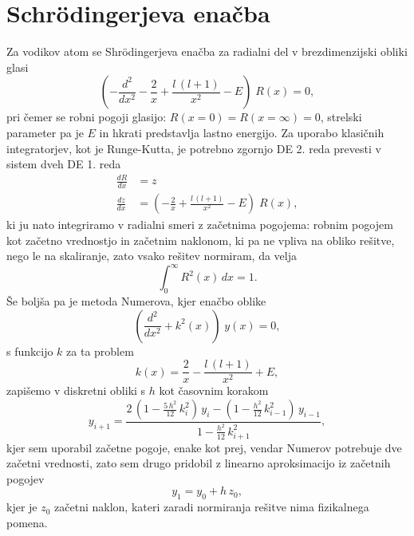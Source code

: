 \graphicspath{{3.nal_slike/}}

\section{Schr{\"o}dingerjeva enačba}

Za vodikov atom se Shr{\"o}dingerjeva enačba za radialni del v brezdimenzijski obliki glasi
\begin{equation}
    \left( -\frac{d^2}{dx^2} - \frac{2}{x} + \frac{l\,(l+1)}{x^2} - E\right)\; R(x) = 0, 
\end{equation}
pri čemer se robni pogoji glasijo: $R(x=0)=R(x=\infty)=0$, strelski parameter pa je $E$ in hkrati predstavlja lastno energijo. Za uporabo klasičnih integratorjev, kot je Runge-Kutta, je potrebno zgornjo DE 2. reda prevesti v sistem dveh DE 1. reda
\begin{align}
    \frac{dR}{dx} &= z\\\nonumber
    \frac{dz}{dx} &= \left(-\frac{2}{x} + \frac{l\,(l+1)}{x^2} - E\right)\; R(x),
\end{align}
ki ju nato integriramo v radialni smeri z začetnima pogojema: robnim pogojem kot začetno vrednostjo in začetnim naklonom, ki pa ne vpliva na obliko rešitve, nego le na skaliranje, zato vsako rešitev normiram, da velja
\begin{equation}
    \int_{0}^{\infty} R^2(x)\,dx = 1.
\end{equation}
Še boljša pa je metoda Numerova, kjer enačbo oblike
\begin{equation}
    \left( \frac{d^2}{dx^2} + k^2(x) \right)\; y(x) = 0,
\end{equation}
s funkcijo $k$ za ta problem
\begin{equation}
    k(x) = \frac{2}{x} - \frac{l\,(l+1)}{x^2} + E,
\end{equation}
zapišemo v diskretni obliki s $h$ kot časovnim korakom
\begin{equation}
    y_{i+1} = \frac{2\,\left(1-\frac{5\,h^2}{12}\,k_i^2\right) \,y_i - \left(1-\frac{h^2}{12}\,k_{i-1}^2 \right)\,y_{i-1}}{1-\frac{h^2}{12}\,k_{i+1}^2},
\end{equation}
kjer sem uporabil začetne pogoje, enake kot prej, vendar Numerov potrebuje dve začetni vrednosti, zato sem drugo pridobil z linearno aproksimacijo iz začetnih pogojev
\begin{equation}
    y_1 = y_0 + h\,z_0,
\end{equation}
kjer je $z_0$ začetni naklon, kateri zaradi normiranja rešitve nima fizikalnega pomena.

